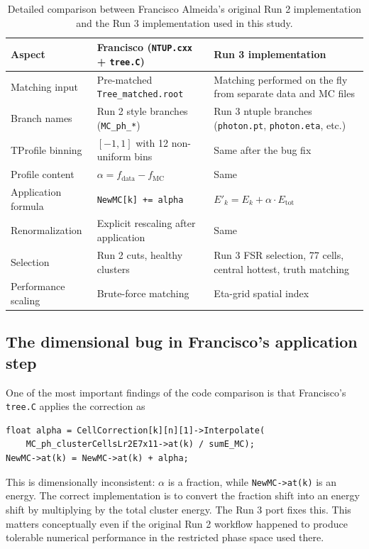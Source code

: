 \documentclass[11pt,a4paper]{article}
\begin{document}
\begin{table}[H]
\centering
\caption{Detailed comparison between Francisco Almeida's original Run 2 implementation and the Run 3 implementation used in this study.}
\label{tab:francisco-comparison}
\begin{tabular}{p{3.2cm}p{5.4cm}p{5.4cm}}
\toprule
Aspect & Francisco (\texttt{NTUP.cxx} + \texttt{tree.C}) & Run 3 implementation \\
\midrule
Matching input & Pre-matched \texttt{Tree\_matched.root} & Matching performed on the fly from separate data and MC files \\
Branch names & Run 2 style branches (\texttt{MC\_ph\_*}) & Run 3 ntuple branches (\texttt{photon.pt}, \texttt{photon.eta}, etc.) \\
TProfile binning & $[-1,1]$ with 12 non-uniform bins & Same after the bug fix \\
Profile content & $\alpha = f_{\mathrm{data}} - f_{\mathrm{MC}}$ & Same \\
Application formula & \texttt{NewMC[k] += alpha} & $E'_k = E_k + \alpha \cdot E_{\mathrm{tot}}$ \\
Renormalization & Explicit rescaling after application & Same \\
Selection & Run 2 cuts, healthy clusters & Run 3 FSR selection, 77 cells, central hottest, truth matching \\
Performance scaling & Brute-force matching & Eta-grid spatial index \\
\bottomrule
\end{tabular}
\end{table}

\subsection{The dimensional bug in Francisco's application step}

One of the most important findings of the code comparison is that Francisco's
\texttt{tree.C} applies the correction as

\begin{lstlisting}
float alpha = CellCorrection[k][n][1]->Interpolate(
    MC_ph_clusterCellsLr2E7x11->at(k) / sumE_MC);
NewMC->at(k) = NewMC->at(k) + alpha;
\end{lstlisting}

This is dimensionally inconsistent: $\alpha$ is a fraction, while
\texttt{NewMC->at(k)} is an energy. The correct implementation is to convert the
fraction shift into an energy shift by multiplying by the total cluster energy.
The Run 3 port fixes this. This matters conceptually even if the original Run 2
workflow happened to produce tolerable numerical performance in the restricted
phase space used there.
\end{document}

